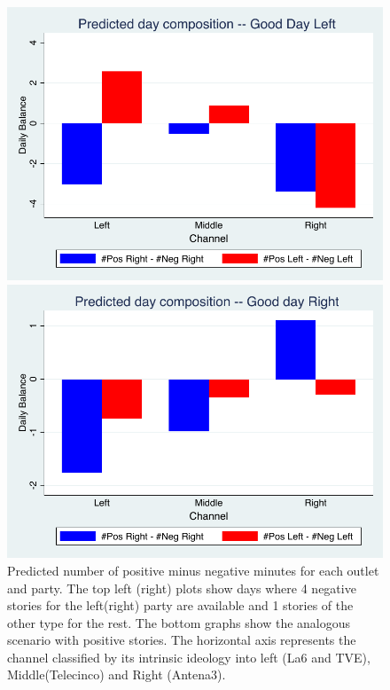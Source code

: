 \documentclass[12pt]{article}
\begin{document}
\begin{figure}[ht]
\begin{minipage}[b]{0.5\linewidth}
			\includegraphics[width=.9\linewidth]{figures/predicted_good_left} 
			\vspace{4ex}
		\end{minipage}%
		\begin{minipage}[b]{0.5\linewidth}
			
			\centering
			\includegraphics[width=.9\linewidth]{figures/predicted_good_right} 
			\vspace{4ex}
		\end{minipage} 
		
		
		\caption{Predicted number of positive minus negative minutes for each outlet and party. The top left (right) plots show days where 4 negative stories for the left(right) party are available and 1 stories of the other type for the rest. The bottom graphs show the analogous scenario with positive stories. 
			The horizontal axis represents the channel classified by its intrinsic ideology into left (La6 and TVE), Middle(Telecinco) and Right (Antena3).  } 
		
		\label{fig:prediction2} 
	\end{figure}
	
\end{document}
